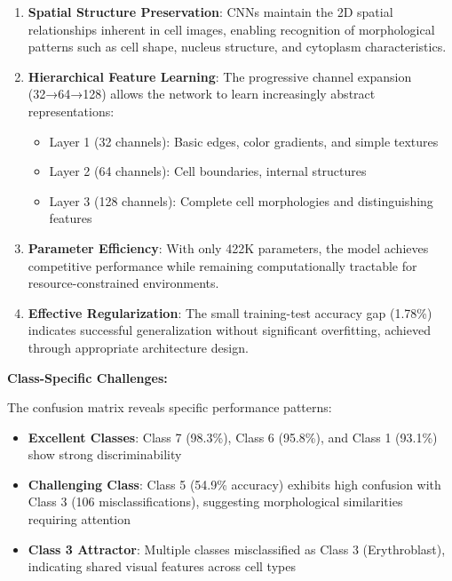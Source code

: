 \documentclass[runningheads]{llncs}
\begin{document}
\begin{enumerate}
    \item \textbf{Spatial Structure Preservation}: CNNs maintain the 2D spatial relationships inherent in cell images, enabling recognition of morphological patterns such as cell shape, nucleus structure, and cytoplasm characteristics.
    
    \item \textbf{Hierarchical Feature Learning}: The progressive channel expansion (32→64→128) allows the network to learn increasingly abstract representations:
    \begin{itemize}
        \item Layer 1 (32 channels): Basic edges, color gradients, and simple textures
        \item Layer 2 (64 channels): Cell boundaries, internal structures
        \item Layer 3 (128 channels): Complete cell morphologies and distinguishing features
    \end{itemize}
    
    \item \textbf{Parameter Efficiency}: With only 422K parameters, the model achieves competitive performance while remaining computationally tractable for resource-constrained environments.
    
    \item \textbf{Effective Regularization}: The small training-test accuracy gap (1.78\%) indicates successful generalization without significant overfitting, achieved through appropriate architecture design.
\end{enumerate}

\textbf{Class-Specific Challenges:}

The confusion matrix reveals specific performance patterns:
\begin{itemize}
    \item \textbf{Excellent Classes}: Class 7 (98.3\%), Class 6 (95.8\%), and Class 1 (93.1\%) show strong discriminability
    \item \textbf{Challenging Class}: Class 5 (54.9\% accuracy) exhibits high confusion with Class 3 (106 misclassifications), suggesting morphological similarities requiring attention
    \item \textbf{Class 3 Attractor}: Multiple classes misclassified as Class 3 (Erythroblast), indicating shared visual features across cell types
\end{itemize}
\end{document}
